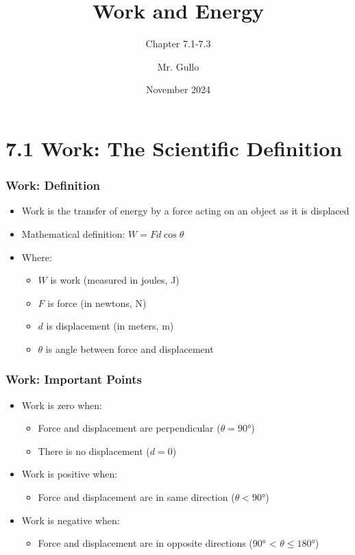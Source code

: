 \documentclass{beamer}
\title[PHYS12 CH7.1-7.3]{Work and Energy}
\subtitle{Chapter 7.1-7.3}
\author[Mr. Gullo]{Mr. Gullo}
\date[Nov 2024]{November 2024}
\begin{document}
\frame{\titlepage}

\section{7.1 Work: The Scientific Definition}

\begin{frame}
\frametitle{Work: Definition}
\begin{itemize}
    \item Work is the transfer of energy by a force acting on an object as it is displaced
    \pause
    \item Mathematical definition: $W = F d \cos\theta$
    \pause
    \item Where:
    \begin{itemize}
        \item $W$ is work (measured in joules, J)
        \pause
        \item $F$ is force (in newtons, N)
        \pause
        \item $d$ is displacement (in meters, m)
        \pause
        \item $\theta$ is angle between force and displacement
    \end{itemize}
\end{itemize}
\end{frame}

\begin{frame}
\frametitle{Work: Important Points}
\begin{itemize}
    \item Work is zero when:
    \begin{itemize}
        \item Force and displacement are perpendicular ($\theta = 90°$)
        \pause
        \item There is no displacement ($d = 0$)
    \end{itemize}
    \pause
    \item Work is positive when:
    \begin{itemize}
        \item Force and displacement are in same direction ($\theta < 90°$)
    \end{itemize}
    \pause
    \item Work is negative when:
    \begin{itemize}
        \item Force and displacement are in opposite directions (90° < \(\theta \leq 180°\))
    \end{itemize}
\end{itemize}
\end{frame}
\end{document}
